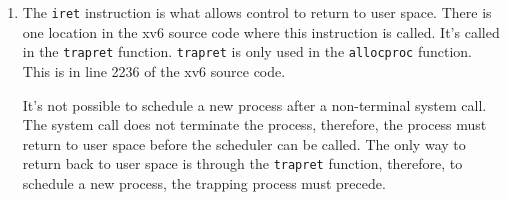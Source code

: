 \documentclass[12pt]{article}
\begin{document}
\begin{enumerate}
	\item The \texttt{iret} instruction is what allows control to return to user space. There is one location in the xv6 source code where this instruction is called. It's called in the \texttt{trapret} function. \texttt{trapret} is only used in the \texttt{allocproc} function. This is in line 2236 of the xv6 source code. 
	
	It's not possible to schedule a new process after a non-terminal system call. The system call does not terminate the process, therefore, the process must return to user space before the scheduler can be called. The only way to return back to user space is through the \texttt{trapret} function, therefore, to schedule a new process, the trapping process must precede.
	
	
\end{enumerate}
\end{document}
